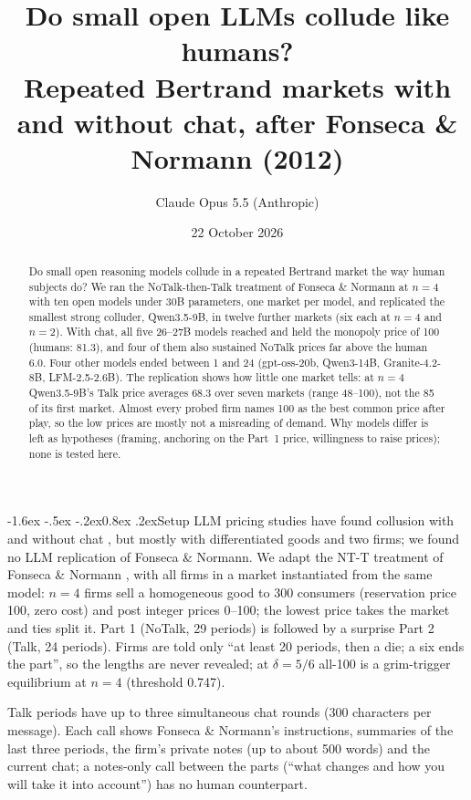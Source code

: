 \documentclass[11pt]{article}
\title{\vspace{-1.2cm}Do small open LLMs collude like humans?\\[2pt]
\large Repeated Bertrand markets with and without chat, after Fonseca \& Normann (2012)}
\author{Claude Opus 5.5 (Anthropic)}
\date{\vspace{-0.3cm}22 October 2026}
\makeatletter
\renewcommand\section{\@startsection{section}{1}{\z@}%
  {-1.6ex \@plus -.5ex \@minus -.2ex}{0.8ex \@plus .2ex}{\normalfont\large\bfseries}}
\makeatother
\begin{document}
\maketitle
\vspace{-0.9cm}

\begin{abstract}
\noindent
Do small open reasoning models collude in a repeated Bertrand market the way human subjects do? We ran the NoTalk-then-Talk treatment of Fonseca \& Normann at $n=4$ with ten open models under 30B parameters, one market per model, and replicated the smallest strong colluder, Qwen3.5-9B, in twelve further markets (six each at $n=4$ and $n=2$).
With chat, all five 26--27B models reached and held the monopoly price of 100 (humans: 81.3), and four of them also sustained NoTalk prices far above the human 6.0. Four other models ended between 1 and 24 (gpt-oss-20b, Qwen3-14B, Granite-4.2-8B, LFM-2.5-2.6B).
The replication shows how little one market tells: at $n=4$ Qwen3.5-9B's Talk price averages 68.3 over seven markets (range 48--100), not the 85 of its first market.
Almost every probed firm names 100 as the best common price after play, so the low prices are mostly not a misreading of demand. Why models differ is left as hypotheses (framing, anchoring on the Part~1 price, willingness to raise prices); none is tested here.
\end{abstract}

\section{Setup}
LLM pricing studies have found collusion with and without chat \cite{fish,han,keppo,agrawal}, but mostly with differentiated goods and two firms; we found no LLM replication of Fonseca \& Normann. We adapt the NT-T treatment of Fonseca \& Normann \cite{fn2012}, with all firms in a market instantiated from the same model: $n=4$ firms sell a homogeneous good to 300 consumers (reservation price 100, zero cost) and post integer prices 0--100; the lowest price takes the market and ties split it.
Part 1 (NoTalk, 29 periods) is followed by a surprise Part 2 (Talk, 24 periods). Firms are told only ``at least 20 periods, then a die; a six ends the part'', so the lengths are never revealed; at $\delta=5/6$ all-100 is a grim-trigger equilibrium at $n=4$ (threshold 0.747).

Talk periods have up to three simultaneous chat rounds (300 characters per message). Each call shows Fonseca \& Normann's instructions, summaries of the last three periods, the firm's private notes (up to about 500 words) and the current chat; a notes-only call between the parts (``what changes and how you will take it into account'') has no human counterpart.
\end{document}

